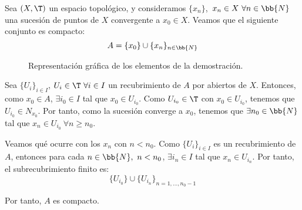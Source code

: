 \begin{ejemplo}
    Sea $(X,\T)$ un espacio topológico, y consideramos $\{x_n\}$,~$x_n\in X~\forall n\in \bb{N}$ una sucesión de puntos de $X$ convergente a $x_0\in X$. Veamos que el siguiente conjunto es compacto:
    \begin{equation*}
        A=\{x_0\}\cup \{x_n\}_{n\in \bb{N}}
    \end{equation*}
    \begin{figure}[H]
        \centering
        \caption{Representación gráfica de los elementos de la demostración.}
    \end{figure}

    Sea $\{U_i\}_{i\in I}$, $U_i\in \T~\forall i\in I$ un recubrimiento de $A$ por abiertos de $X$. Entonces, como $x_0\in A$, $\exists i_0\in I$ tal que $x_0\in U_{i_0}$.
    Como $U_{i_0}\in \T$ con $x_0\in U_{i_0}$, tenemos que $U_{i_0}\in N_{x_0}$. Por tanto, como la sucesión converge a $x_0$, tenemos que
    $\exists n_0\in \bb{N}$ tal que $x_n\in U_{i_0}~\forall n\geq n_0$.

    Veamos qué ocurre con los $x_n$ con $n<n_0$. Como $\{U_i\}_{i\in I}$ es un recubrimiento de $A$, entonces para cada $n\in \bb{N},~n<n_0$, $\exists i_n\in I$ tal que $x_n\in U_{i_n}$.
    Por tanto, el subrecubrimiento finito es:
    \begin{equation*}
        \{U_{i_0}\} \cup \{U_{i_n}\}_{n=1,\dots,n_0-1}
    \end{equation*}

    Por tanto, $A$ es compacto.
\end{ejemplo}


